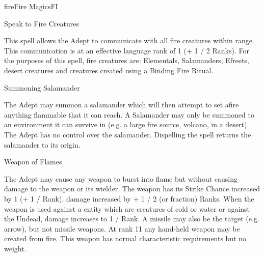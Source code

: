 \begin{College}[2.0]{fire}{Fire Magics}{FI}
\begin{spell}[S-10]{Speak to Fire Creatures}

\begin{effects}
This spell allows the Adept to communicate with all fire creatures
within range.  This communication is at an effective language rank of
1 (+ 1 / 2 Ranks).  For the purposes of this spell, fire creatures
are: Elementals, Salamanders, Efreets, desert creatures and creatures
created using a Binding Fire Ritual.
\end{effects}
\end{spell}

\begin{spell}[S-11]{Summoning Salamander}

\begin{effects}
The Adept may summon a salamander which will then attempt to set afire
anything flammable that it can reach. A Salamander may only be
summoned to an environment it can survive in (e.g.  a large fire
source, volcano, in a desert). The Adept has no control over the
salamander. Dispelling the spell returns the salamander to its origin.

\end{effects}
\end{spell}

\begin{spell}[S-12]{Weapon of Flames}

\begin{effects}
The Adept may cause any weapon to burst into flame but without causing
damage to the weapon or its wielder.  The weapon has its Strike Chance
increased by 1 (+ 1 / Rank), damage increased by + 1 / 2 (or fraction)
Ranks.  When the weapon is used against a entity which are creatures
of cold or water or against the Undead, damage increases to 1 / Rank.
A missile may also be the target (e.g.  arrow), but not missile
weapons.  At rank 11 any hand-held weapon may be created from fire.
This weapon has normal characteristic requirements but no weight.
\end{effects}
\end{spell}


\end{College}
